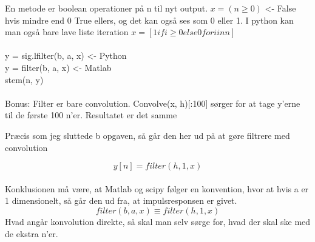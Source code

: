 \begin{Opgaver}
\begin{kapitel}
\begin{Opgave}
\begin{UnderOpgave}[Beregn og plot output med \text{x[n] = u[n]}]
                En metode er boolean operationer på n til nyt output. 
                $x = (n \geq 0)$ <- False hvis mindre end 0 True ellers, og det kan også ses som 0 eller 1. 
                I python kan man også bare lave liste iteration
                $x = [1 if i \geq 0 else 0 for i in n]$
                \\
                \\y = sig.lfilter(b, a, x) <- Python 
                \\y = filter(b, a, x) <- Matlab 
                \\stem(n, y) \\\\
                Bonus: 
                Filter er bare convolution. Convolve(x, h)[:100] sørger for at tage y'erne til de første 100 n'er. 
                Resultatet er det samme 
            \end{UnderOpgave}\clearpage
            \begin{UnderOpgave}
                Præcis som jeg sluttede b opgaven, så går den her ud på at gøre filtrere med convolution
            \end{UnderOpgave}
            \begin{UnderOpgave}
                \[y[n] = filter(h, 1, x)\]
                \\
                Konklusionen må være, at Matlab og scipy følger en konvention, hvor at hvis a er 1 dimensionelt, så går den ud fra, at impulsresponsen er givet.
                \[filter(b, a, x) \equiv filter(h, 1, x)\]
                Hvad angår konvolution direkte, så skal man selv sørge for, hvad der skal ske med de ekstra n'er.               
                
            \end{UnderOpgave}
        \end{Opgave}


\end{kapitel}
\end{Opgaver}
